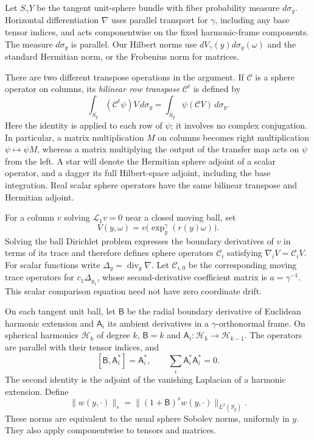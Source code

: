 Let $S_\gamma Y$ be the tangent unit-sphere bundle with fiber probability
measure $d\sigma_y$.  Horizontal differentiation $\nabla$ uses parallel
transport for $\gamma$, including any base tensor indices, and acts
componentwise on the fixed harmonic-frame components.  The measure
$d\sigma_y$ is parallel.  Our Hilbert norms use
$dV_\gamma(y)d\sigma_y(\omega)$ and the standard Hermitian norm, or the
Frobenius norm for matrices.

There are two different transpose operations in the argument.  If
$\mathcal C$ is a sphere operator on columns, its \emph{bilinear row
transpose} $\mathcal C^t$ is defined by
\begin{equation}\label{ang:row-transpose}
 \int_{S_y}(\mathcal C^t\psi)V\,d\sigma_y
       =\int_{S_y}\psi(\mathcal C V)\,d\sigma_y.
\end{equation}
Here the identity is applied to each row of $\psi$; it involves no
complex conjugation.  In particular, a matrix multiplication $M$ on
columns becomes right multiplication $\psi\mapsto\psi M$, whereas a
matrix multiplying the output of the transfer map acts on $\psi$ from
the left.  A star will denote the Hermitian sphere adjoint of a scalar
operator, and a dagger its full Hilbert-space adjoint, including the
base integration.  Real scalar sphere operators have the same
bilinear transpose and Hermitian adjoint.

For a column $v$ solving $\mathcal L_1v=0$ near a closed moving ball, set
\[
 V(y,\omega)=v\bigl(\exp_y^\gamma(r(y)\omega)\bigr).
\]
Solving the ball Dirichlet problem expresses the boundary derivatives of
$v$ in terms of its trace and therefore defines sphere operators
$\mathcal C_i$ satisfying $\nabla_iV=\mathcal C_iV$.
For scalar functions write $\Delta_g=\operatorname{div}_g\nabla$.
Let $\mathcal C_{i,0}$ be the corresponding moving trace operators for
$c_1\Delta_{g_1}$, whose second-derivative coefficient matrix is
$a=\gamma^{-1}$.  This scalar comparison equation need not have zero
coordinate drift.

On each tangent unit ball, let $\mathsf B$ be the radial boundary
derivative of Euclidean harmonic extension and $\mathsf A_i$ its ambient
derivatives in a $\gamma$-orthonormal frame.  On spherical harmonics
$\mathcal H_k$ of degree $k$, $\mathsf B=k$ and
$\mathsf A_i:\mathcal H_k\to\mathcal H_{k-1}$.  The operators are parallel
with their tensor indices, and
\begin{equation}\label{ang:elementary-identities}
 [\mathsf B,\mathsf A_i^*]=\mathsf A_i^*,
 \qquad \sum_i\mathsf A_i^*\mathsf A_i^*=0.
\end{equation}
The second identity is the adjoint of the vanishing Laplacian of a
harmonic extension.  Define
\[
 \|w(y,\cdot)\|_s=\|(1+\mathsf B)^s w(y,\cdot)\|_{L^2(S_y)}.
\]
These norms are equivalent to the usual sphere Sobolev norms, uniformly
in $y$.  They also apply componentwise to tensors and matrices.

